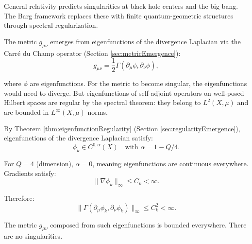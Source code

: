 \begin{theorem}
\label{thm:singularityResolution}

General relativity predicts singularities at black hole centers and the big bang. The Barg framework replaces these with finite quantum-geometric structures through spectral regularization.

\begin{definition}

The metric $g_{\mu\nu}$ emerges from eigenfunctions of the divergence Laplacian via the Carré du Champ operator (Section \ref{sec:metricEmergence}):
\begin{equation}
g_{\mu\nu} = \frac{1}{2}\Gamma(\partial_\mu\phi, \partial_\nu\phi),
\end{equation}

where $\phi$ are eigenfunctions. For the metric to become singular, the eigenfunctions would need to diverge. But eigenfunctions of self-adjoint operators on well-posed Hilbert spaces are regular by the spectral theorem: they belong to $L^2(X, \mu)$ and are bounded in $L^\infty(X, \mu)$ norms.

\end{definition}

\begin{theorem}
\label{thm:eigenfunction Regularity}

By Theorem \ref{thm:eigenfunctionRegularity} (Section \ref{sec:regularityEmergence}), eigenfunctions of the divergence Laplacian satisfy:
\begin{equation}
\phi_k \in C^{0,\alpha}(X) \quad \text{with } \alpha = 1 - Q/4.
\end{equation}

For $Q = 4$ (dimension), $\alpha = 0$, meaning eigenfunctions are continuous everywhere. Gradients satisfy:
\begin{equation}
\|\nabla \phi_k\|_{\infty} \leq C_k < \infty.
\end{equation}

Therefore:
\begin{equation}
\|\Gamma(\partial_\mu\phi_k, \partial_\nu\phi_k)\|_{\infty} \leq C_k^2 < \infty.
\end{equation}

The metric $g_{\mu\nu}$ composed from such eigenfunctions is bounded everywhere. There are no singularities.


\end{theorem}
\end{theorem}
